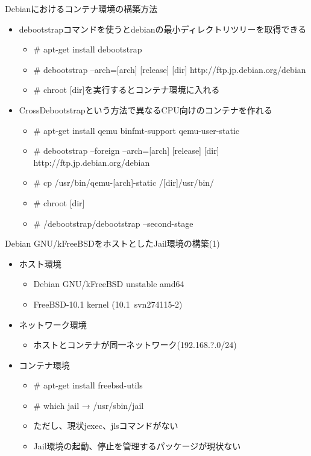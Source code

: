 \begin{frame}[containsverbatim]{Debianにおけるコンテナ環境の構築方法}
  \begin{itemize}
    \item debootstrapコマンドを使うとdebianの最小ディレクトリツリーを取得できる
    \begin{itemize}
      \item \# apt-get install debootstrap
      \item \# debootstrap --arch=[arch] [release] [dir] http://ftp.jp.debian.org/debian
      \item \# chroot [dir]を実行するとコンテナ環境に入れる
    \end{itemize}
    \item CrossDebootstrapという方法で異なるCPU向けのコンテナを作れる
    \begin{itemize}
      \item \# apt-get install qemu binfmt-support qemu-user-static
      \item \# debootstrap --foreign --arch=[arch] [release] [dir] http://ftp.jp.debian.org/debian
      \item \# cp /usr/bin/qemu-[arch]-static /[dir]/usr/bin/
      \item \# chroot [dir]
      \item \# /debootstrap/debootstrap --second-stage
    \end{itemize}
  \end{itemize}
\end{frame}


\begin{frame}[containsverbatim]{Debian GNU/kFreeBSDをホストとしたJail環境の構築(1)}
  \begin{itemize}
    \item ホスト環境
    \begin{itemize}
      \item Debian GNU/kFreeBSD unstable amd64
      \item FreeBSD-10.1 kernel (10.1~svn274115-2)
    \end{itemize}
    \item ネットワーク環境
    \begin{itemize}
      \item ホストとコンテナが同一ネットワーク(192.168.?.0/24)
    \end{itemize}
    \item コンテナ環境
    \begin{itemize}
      \item \# apt-get install freebsd-utils
      \item \# which jail  →  /usr/sbin/jail 
      \item ただし、現状jexec、jlsコマンドがない
      \item Jail環境の起動、停止を管理するパッケージが現状ない
    \end{itemize}
  \end{itemize}
\end{frame}


